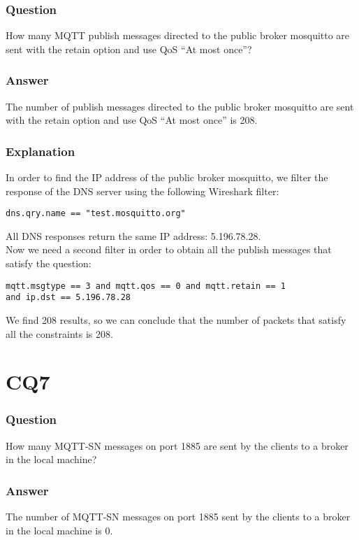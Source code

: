 \subsubsection{Question}
How many MQTT publish messages directed to the public broker mosquitto are sent with the retain option and use QoS “At most once”?

\subsubsection{Answer}
The number of publish messages directed to the public broker mosquitto are sent with the retain option and use QoS “At most once” is 208.

\subsubsection{Explanation}
In order to find the IP address of the public broker mosquitto, we filter the response of the DNS server using the following Wireshark filter:
\begin{verbatim}
dns.qry.name == "test.mosquitto.org"
\end{verbatim}
All DNS responses return the same IP address: 5.196.78.28.\\
Now we need a second filter in order to obtain all the publish messages that satisfy the question:
\begin{verbatim}
mqtt.msgtype == 3 and mqtt.qos == 0 and mqtt.retain == 1 
and ip.dst == 5.196.78.28
\end{verbatim}
We find 208 results, so we can conclude that the number of packets that satisfy all the constraints is 208.

\section{CQ7}
\subsubsection{Question}
How many MQTT-SN messages on port 1885 are sent by the clients to a broker in the local machine?

\subsubsection{Answer}
The number of MQTT-SN messages on port 1885 sent by the clients to a broker in the local machine is 0.

